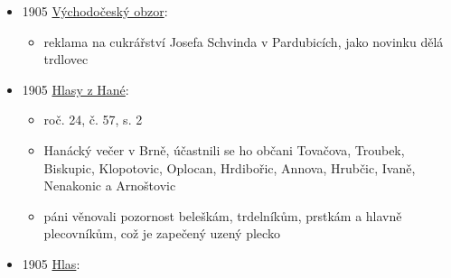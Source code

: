 \begin{itemize}
\begin{itemize}
    \begin{itemize}
    \tightlist
    \item
      máslové trubičky (kremrole)
    \item
      máslové těsto se vyválí a nakrájí na dlouhé a široké nudle, ovinou
      se kolem formičky ve vodě namočené
    \item
      pomažou se žloutkem a pečou prudce a pak pomaleji. nakonec se
      ještě sundají z formičky a dopečou, aby se dopekl vnitřek
    \item
      plní se krémem nebo šlehačkou
    \end{itemize}
  \item
    s. 167:

    \begin{itemize}
    \tightlist
    \item
      nekynutý těsto ze žloutků, másla, mouky a cukru
    \item
      vyválí se na plát, rozřeže ne plátky a namotá na formy na kremrole
      (takže se asi běžně prodávaly?)
    \item
      pomaže žloutkem, posype cukrem a mandlema, peče
    \item
      plní se bílkovým krémem nebo smetanou
    \end{itemize}
  \end{itemize}
\item
  1905
  \href{https://ndk.cz/uuid/uuid:31d86eff-f5d9-441b-9494-0d00a884e18e}{Východočeský
  obzor}:

  \begin{itemize}
  \tightlist
  \item
    reklama na cukrářství Josefa Schvinda v Pardubicích, jako novinku
    dělá trdlovec
  \end{itemize}
\item
  1905
  \href{https://www.digitalniknihovna.cz/vkol/uuid/uuid:40cf0c6c-d1ed-45ef-9e18-2dc01cf9a5a8}{Hlasy
  z Hané}:

  \begin{itemize}
  \tightlist
  \item
    roč. 24, č. 57, s. 2
  \item
    Hanácký večer v Brně, účastnili se ho občani Tovačova, Troubek,
    Biskupic, Klopotovic, Oplocan, Hrdibořic, Annova, Hrubčic, Ivaně,
    Nenakonic a Arnoštovic
  \item
    páni věnovali pozornost beleškám, trdelníkům, prstkám a hlavně
    plecovníkům, což je zapečený uzený plecko
  \end{itemize}
\item
  1905
  \href{https://www.digitalniknihovna.cz/vkol/uuid/uuid:5ad15202-a9c3-4bbf-899c-8d9c04672d81}{Hlas}:


\end{itemize}

